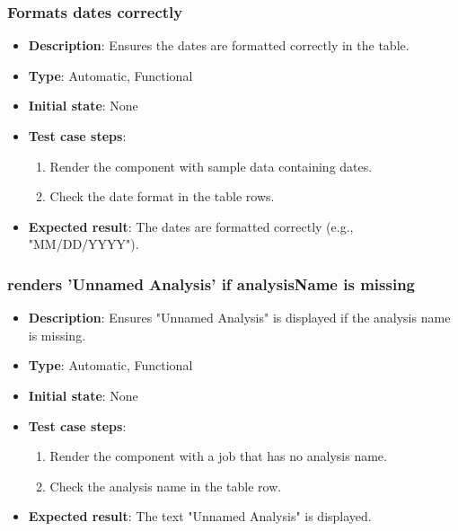 \documentclass[12pt, titlepage]{article}
\begin{document}
\subsubsection{Formats dates correctly}
\begin{itemize}
    \item \textbf{Description}: Ensures the dates are formatted correctly in the table.
    \item \textbf{Type}: Automatic, Functional
    \item \textbf{Initial state}: None
    \item \textbf{Test case steps}:
    \begin{enumerate}
        \item Render the component with sample data containing dates.
        \item Check the date format in the table rows.
    \end{enumerate}
    \item \textbf{Expected result}: The dates are formatted correctly (e.g., "MM/DD/YYYY").
\end{itemize}

\subsubsection{renders 'Unnamed Analysis' if analysisName is missing}
\begin{itemize}
    \item \textbf{Description}: Ensures "Unnamed Analysis" is displayed if the analysis name is missing.
    \item \textbf{Type}: Automatic, Functional
    \item \textbf{Initial state}: None
    \item \textbf{Test case steps}:
    \begin{enumerate}
        \item Render the component with a job that has no analysis name.
        \item Check the analysis name in the table row.
    \end{enumerate}
    \item \textbf{Expected result}: The text "Unnamed Analysis" is displayed.
\end{itemize}
\end{document}
